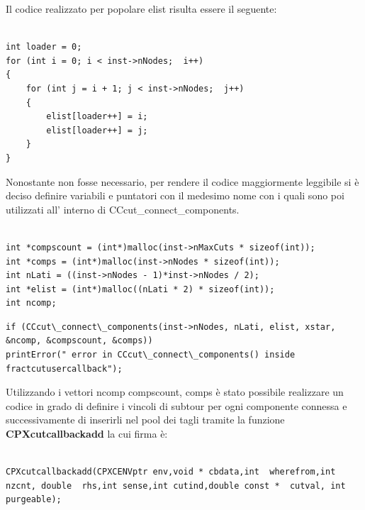 \documentclass[11pt]{article}
\begin{document}
Il codice realizzato per popolare elist risulta essere il seguente:


\begin{lstlisting}

int loader = 0;
for (int i = 0; i < inst->nNodes;  i++)
{
	for (int j = i + 1; j < inst->nNodes;  j++) 
	{
	    elist[loader++] = i;
	    elist[loader++] = j;
	}
}

\end{lstlisting}

Nonostante non fosse necessario, per rendere il codice maggiormente leggibile si è deciso definire variabili e puntatori con il medesimo nome con i quali sono poi utilizzati all’ interno di CCcut\_connect\_components.

\begin{lstlisting}

int *compscount = (int*)malloc(inst->nMaxCuts * sizeof(int));		
int *comps = (int*)malloc(inst->nNodes * sizeof(int)); 
int nLati = ((inst->nNodes - 1)*inst->nNodes / 2);
int *elist = (int*)malloc((nLati * 2) * sizeof(int));		
int ncomp; 

\end{lstlisting}


\begin{lstlisting}
if (CCcut\_connect\_components(inst->nNodes, nLati, elist, xstar, &ncomp, &compscount, &comps))
printError(" error in CCcut\_connect\_components() inside fractcutusercallback");
\end{lstlisting}
 
Utilizzando i vettori ncomp compscount, comps è stato possibile realizzare un codice in grado di definire i vincoli di subtour per ogni componente connessa e successivamente di inserirli nel pool dei tagli tramite la funzione \textbf{CPXcutcallbackadd} la cui firma è:

\begin{lstlisting}

CPXcutcallbackadd(CPXCENVptr env,void * cbdata,int  wherefrom,int  nzcnt, double  rhs,int sense,int cutind,double const *  cutval, int purgeable);

\end{lstlisting}
\end{document}
